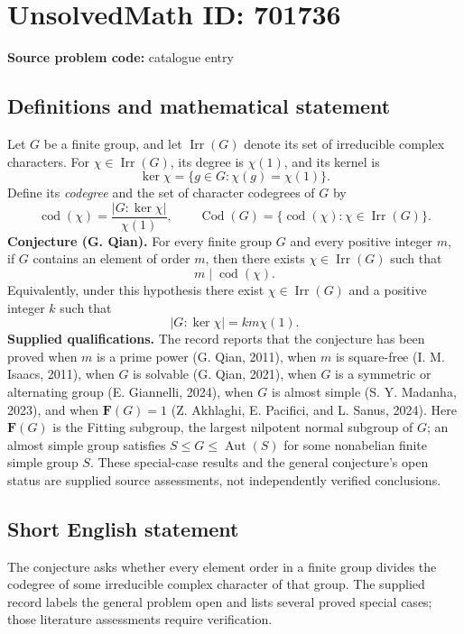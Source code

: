 \documentclass[11pt]{article}
\begin{document}
\section*{UnsolvedMath ID: 701736}
\textbf{Source problem code:} catalogue entry
\subsection{Definitions and mathematical statement}
Let \(G\) be a finite group, and let \(\operatorname{Irr}(G)\) denote its set of irreducible complex characters. For \(\chi\in\operatorname{Irr}(G)\), its degree is \(\chi(1)\), and its kernel is
\[
\ker\chi=\{g\in G:\chi(g)=\chi(1)\}.
\]
Define its \emph{codegree} and the set of character codegrees of \(G\) by
\[
\operatorname{cod}(\chi)=\frac{|G:\ker\chi|}{\chi(1)},
\qquad
\operatorname{Cod}(G)=\{\operatorname{cod}(\chi):\chi\in\operatorname{Irr}(G)\}.
\]
\textbf{Conjecture (G. Qian).} For every finite group \(G\) and every positive integer \(m\), if \(G\) contains an element of order \(m\), then there exists \(\chi\in\operatorname{Irr}(G)\) such that
\[
m\mid\operatorname{cod}(\chi).
\]
Equivalently, under this hypothesis there exist \(\chi\in\operatorname{Irr}(G)\) and a positive integer \(k\) such that
\[
|G:\ker\chi|=km\chi(1).
\]
\textbf{Supplied qualifications.} The record reports that the conjecture has been proved when \(m\) is a prime power (G. Qian, 2011), when \(m\) is square-free (I. M. Isaacs, 2011), when \(G\) is solvable (G. Qian, 2021), when \(G\) is a symmetric or alternating group (E. Giannelli, 2024), when \(G\) is almost simple (S. Y. Madanha, 2023), and when \(\mathbf F(G)=1\) (Z. Akhlaghi, E. Pacifici, and L. Sanus, 2024). Here \(\mathbf F(G)\) is the Fitting subgroup, the largest nilpotent normal subgroup of \(G\); an almost simple group satisfies \(S\leq G\leq\operatorname{Aut}(S)\) for some nonabelian finite simple group \(S\). These special-case results and the general conjecture's open status are supplied source assessments, not independently verified conclusions.
\subsection{Short English statement}
The conjecture asks whether every element order in a finite group divides the codegree of some irreducible complex character of that group. The supplied record labels the general problem open and lists several proved special cases; those literature assessments require verification.
\end{document}
